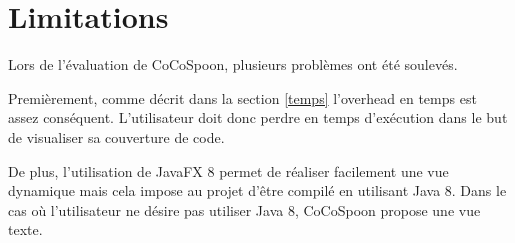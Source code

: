 \section{Limitations}

Lors de l'évaluation de CoCoSpoon, plusieurs problèmes ont été soulevés. \\  
\par Premièrement, comme décrit dans la section \ref{temps} l'overhead en temps est assez conséquent. L'utilisateur doit donc perdre en temps d'exécution dans le but de visualiser sa couverture de code.
\par De plus, l'utilisation de JavaFX 8 permet de réaliser facilement une vue dynamique mais cela impose au projet d'être compilé en utilisant Java 8. Dans le cas où l'utilisateur ne désire pas utiliser Java 8, CoCoSpoon propose une vue texte. 